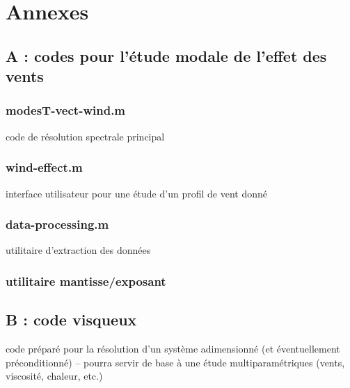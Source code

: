\section{Annexes}

\subsection{A : codes pour l'étude modale de l'effet des vents}
\label{annexe:A}

\subsubsection{modesT-vect-wind.m}
\label{annexe:A:modesTvectwind.m}
code de résolution spectrale principal


\subsubsection{wind-effect.m}
\label{annexe:A:windeffect.m}
interface utilisateur pour une étude d'un profil de vent donné


\subsubsection{data-processing.m}
\label{annexe:A:dataprocessing.m}
utilitaire d'extraction des données


\subsubsection{utilitaire mantisse/exposant}
\label{annexe:A:mantexpnt.m}


\subsection{B : code visqueux}
\label{annexe:B}

code préparé pour la résolution d'un système adimensionné (et éventuellement préconditionné) -- pourra servir de base à une étude multiparamétriques (vents, viscosité, chaleur, etc.)


